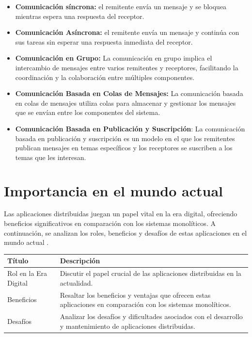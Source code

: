 	\begin{itemize}
		\item \textbf{Comunicación síncrona:} el remitente envía un mensaje y se bloquea mientras espera una respuesta del receptor.
		\item \textbf{Comunicación Asíncrona:} el remitente envía un mensaje y continúa con sus tareas sin esperar una respuesta inmediata del receptor.
		\item \textbf{Comunicación en Grupo:} La comunicación en grupo implica el intercambio de mensajes entre varios remitentes y receptores, facilitando la coordinación y la colaboración entre múltiples componentes.
		\item \textbf{Comunicación Basada en Colas de Mensajes:} La comunicación basada en colas de mensajes utiliza colas para almacenar y gestionar los mensajes que se envían entre los componentes del sistema.
		\item \textbf{Comunicación Basada en Publicación y Suscripción}: La comunicación basada en publicación y suscripción es un modelo en el que los remitentes publican mensajes en temas específicos y los receptores se suscriben a los temas que les interesan.
	\end{itemize}

\section{Importancia en el mundo actual}
\noindent
Las aplicaciones distribuidas juegan un papel vital en la era digital, ofreciendo beneficios significativos en comparación con los sistemas monolíticos. A continuación, se analizan los roles, beneficios y desafíos de estas aplicaciones en el mundo actual \cite{Chauhan2023otp}.

\noindent
\begin{tabular}{|l|p{10cm}|}
	\hline
	Título & Descripción \\
	\hline
	Rol en la Era Digital & Discutir el papel crucial de las aplicaciones distribuidas en la actualidad. \\
	\hline
	Beneficios & Resaltar los beneficios y ventajas que ofrecen estas aplicaciones en comparación con los sistemas monolíticos. \\
	\hline
	Desafíos & Analizar los desafíos y dificultades asociados con el desarrollo y mantenimiento de aplicaciones distribuidas. \\
	\hline
\end{tabular}

